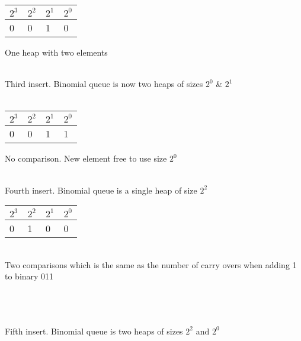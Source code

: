 \documentclass[12pt,letterpaper]{article}
\begin{document}
\begin{tabular}{ |l|l|l|l| }
   \hline
   $2^3$  & $2^2$  & $2^1$  & $2^0$ \\ \hline
    0 & 0 & 1 & 0 \\
   \hline
 \end{tabular} One heap with two elements\\\\
Third insert. Binomial queue is now two heaps of sizes $2^0$ \& $2^1$\\\\
\begin{tabular}{ |l|l|l|l| }
   \hline
   $2^3$  & $2^2$  & $2^1$  & $2^0$ \\ \hline
    0 & 0 & 1 & 1 \\
   \hline
 \end{tabular} No comparison. New element free to use size $2^0$\\\\
Fourth insert. Binomial queue is a single heap of size $2^2$
\begin{tabular}{ |l|l|l|l| }
   \hline
   $2^3$  & $2^2$  & $2^1$  & $2^0$ \\ \hline
    0 & 1 & 0 & 0 \\
   \hline
 \end{tabular}\\Two comparisons which is the same as the number of carry overs when adding 1 to binary 011\\\\
\newpage
{}
\hspace*{.25 in}
\\\\Fifth insert. Binomial queue is two heaps of sizes $2^2$ and $2^0$\\
\end{document}
